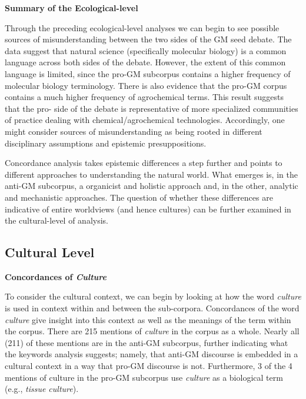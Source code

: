 \textbf{Summary of the Ecological-level}

Through the preceding ecological-level analyses we can begin to see possible sources of misunderstanding between the two sides of the GM seed debate. The data suggest that natural science (specifically molecular biology) is a common language across both sides of the debate. However, the extent of this common language is limited, since the pro-GM subcorpus contains a higher frequency of molecular biology terminology. There is also evidence that the pro-GM corpus contains a much higher frequency of agrochemical terms. This result suggests that the pro- side of the debate is representative of more specialized communities of practice dealing with chemical/agrochemical technologies. Accordingly, one might consider sources of misunderstanding as being rooted in different disciplinary assumptions and epistemic presuppositions. 

Concordance analysis takes epistemic differences a step further and points to different approaches to understanding the natural world. What emerges is, in the anti-GM subcorpus, a organicist and holistic approach and, in the other, analytic and mechanistic approaches. The question of whether these differences are indicative of entire worldviews (and hence cultures) can be further examined in the cultural-level of analysis.       

\subsection{Cultural Level}

\textbf{Concordances of \textit{Culture}}

To consider the cultural context, we can begin by looking at how the word \textit{culture} is used in context within and between the sub-corpora. Concordances of the word \textit{culture} give insight into this context as well as the meanings of the term within the corpus. There are 215 mentions of \textit{culture} in the corpus as a whole. Nearly all (211) of these mentions are in the anti-GM subcorpus, further indicating what the keywords analysis suggests; namely, that anti-GM discourse is embedded in a cultural context in a way that pro-GM discourse is not. Furthermore, 3 of the 4 mentions of culture in the pro-GM subcorpus use \textit{culture} as a biological term (e.g., \textit{tissue culture}).

